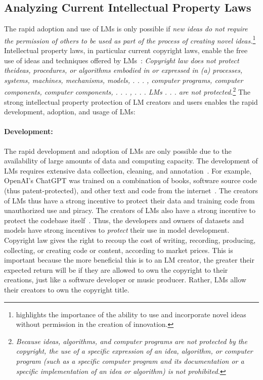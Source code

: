 \documentclass{article} %
\begin{document}
\subsection{Analyzing Current Intellectual Property Laws}

The rapid adoption and use of LMs is only possible if    \emph{new ideas do not require the permission of others to be used as part of the process of creating novel ideas.}\footnote{\citet{von2006democratizing} highlights the importance of the ability to use and incorporate novel ideas without permission in the creation of innovation.} Intellectual property laws, in particular current copyright laws, enable the free use of ideas and techniques offered by LMs~\citep{ginsburg2025humanist, restrepo2023automation}:    \emph{ Copyright law does not protect theideas, procedures, or algorithms embodied in or expressed in \textit{(a)} processes, systems, machines, mechanisms, models, . . . , computer programs, computer components, computer components, . . . ,  . . . LMs . . . are not protected.}\footnote{\emph{Because ideas, algorithms, and computer programs are not protected by the copyright, the use of a \emph{specific expression} of an idea, algorithm, or computer program (such as a specific computer program and its documentation or a specific implementation of an idea or algorithm) is not prohibited.}} The strong intellectual property protection of LM creators and users enables the rapid development, adoption, and usage of LMs:

\paragraph{Development:}  The rapid development and adoption of LMs are only possible due to the availability of large amounts of data and computing capacity.
The development of LMs requires extensive data collection, cleaning, and annotation~\citep{neurips1, dodge-etal-2021-documenting}.
For example, OpenAI's ChatGPT was trained on a combination of books, software source code (thus patent-protected), and other text and code from the internet~\citep{langley00}.
The creators of LMs thus have a strong incentive to protect their data and training code from unauthorized use and piracy.
The creators of LMs also have a strong incentive to protect the codebase itself~\citep{henderson2023foundation, lemley2020fair}.
Thus, the developers and owners of datasets and models have strong incentives to \emph{protect} their use in model development.
Copyright law gives the right to recoup the cost of writing, recording, producing, collecting, or creating code or content, according to market prices.
This is important because the more beneficial this is to an LM creator, the greater their expected return will be if they are allowed to own the copyright to their creations, just like a software developer or music producer.
Rather, LMs allow their creators to own the copyright title.
\end{document}
